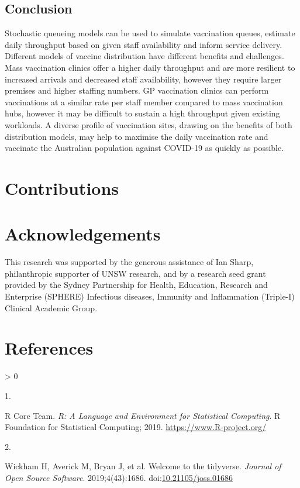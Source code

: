 \documentclass{article}
\newlength{\csllabelwidth}
\newlength{\cslhangindent}
\newenvironment{CSLReferences}[3] %
 {%
  \setlength{\parindent}{0pt}
  \ifodd #1 \everypar{\setlength{\hangindent}{\cslhangindent}}\ignorespaces\fi
  \ifnum #2 > 0
  \setlength{\parskip}{#2\baselineskip}
  \fi
 }%
 {}
\newcommand{\CSLLeftMargin}[1]{\parbox[t]{\csllabelwidth}{#1}}
\newcommand{\CSLRightInline}[1]{\parbox[t]{\linewidth - \csllabelwidth}{#1}}
\begin{document}
\hypertarget{conclusion}{%
\subsection{Conclusion}\label{conclusion}}

Stochastic queueing models can be used to simulate vaccination queues,
estimate daily throughput based on given staff availability and inform
service delivery. Different models of vaccine distribution have
different benefits and challenges. Mass vaccination clinics offer a
higher daily throughput and are more resilient to increased arrivals and
decreased staff availability, however they require larger premises and
higher staffing numbers. GP vaccination clinics can perform vaccinations
at a similar rate per staff member compared to mass vaccination hubs,
however it may be difficult to sustain a high throughput given existing
workloads. A diverse profile of vaccination sites, drawing on the
benefits of both distribution models, may help to maximise the daily
vaccination rate and vaccinate the Australian population against
COVID-19 as quickly as possible.

\hypertarget{contributions}{%
\section{Contributions}\label{contributions}}

\hypertarget{acknowledgements}{%
\section{Acknowledgements}\label{acknowledgements}}

This research was supported by the generous assistance of Ian Sharp,
philanthropic supporter of UNSW research, and by a research seed grant
provided by the Sydney Partnership for Health, Education, Research and
Enterprise (SPHERE) Infectious diseases, Immunity and Inflammation
(Triple-I) Clinical Academic Group.

\newpage

\hypertarget{references}{%
\section*{References}\label{references}}

\hypertarget{refs}{}
\begin{CSLReferences}{0}{0}
\leavevmode\hypertarget{ref-R-base}{}%
\CSLLeftMargin{1. }
\CSLRightInline{R Core Team. \emph{R: A Language and Environment for
Statistical Computing}. R Foundation for Statistical Computing; 2019.
\url{https://www.R-project.org/}}

\leavevmode\hypertarget{ref-tidyverse2019}{}%
\CSLLeftMargin{2. }
\CSLRightInline{Wickham H, Averick M, Bryan J, et al. Welcome to the
{tidyverse}. \emph{Journal of Open Source Software}. 2019;4(43):1686.
doi:\href{https://doi.org/10.21105/joss.01686}{10.21105/joss.01686}}

\end{CSLReferences}



\end{document}
